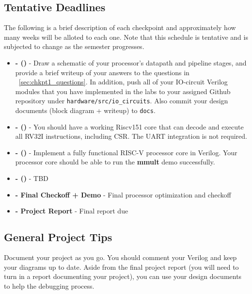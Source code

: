 \documentclass[11pt]{article}
\begin{document}
\subsection{Tentative Deadlines}
\label{tentative_deadlines}
The following is a brief description of each checkpoint and approximately how many weeks will be alloted to each one. Note that this schedule is tentative and is subjected to change as the semester progresses.


\begin{itemize}
  \item \textbf{\blockDiagramDueDate \space - \blockDiagramTaskName \space (\blockDiagramTimeAlloted)} - Draw a schematic of your processor's datapath and pipeline stages, and provide a brief writeup of your answers to the questions in ~\ref{sec:chkpt1_questions}. In addition, push all of your IO-circuit Verilog modules that you have implemented in the labs to your assigned Github repository under \verb|hardware/src/io_circuits|. Also commit your design documents (block diagram + writeup) to \verb|docs|.
  \item \textbf{\ALUDueDate \space - \ALUTaskName \space (\ALUTimeAlloted)} - You should have a working Riscv151 core that can decode and execute all RV32I instructions, including CSR. The UART integration is not required.
  \item \textbf{\baseCPUDueDate \space - \baseCPUTaskName \space (\baseCPUTimeAlloted)} - Implement a fully functional RISC-V processor core in Verilog. Your processor core should be able to run the \textbf{mmult} demo successfully.
  \item \textbf{\imageDueDate \space - \imageTaskName \space (\imageTimeAlloted)} - TBD

  \item \textbf{\finalCheckoffDueDate \space - Final Checkoff + Demo} - Final processor optimization and checkoff
  \item \textbf{\finalReportDueDate \space - Project Report} - Final report due
\end{itemize}

\subsection{General Project Tips}
\label{tips}
Document your project as you go.
You should comment your Verilog and keep your diagrams up to date.
Aside from the final project report (you will need to turn in a report documenting your project), you can use your design documents to help the debugging process.
\end{document}

